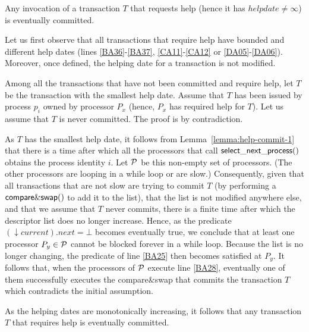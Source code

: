 \begin{lemma}
\label{lemma:helped-transaction}
Any invocation of a transaction $T$ that requests help 
(hence it has $helpdate \neq \infty$) is eventually committed.
\end{lemma}

\begin{proofL}
Let us first observe that all transactions that require help 
have bounded and different help dates  (lines \ref{BA36}-\ref{BA37}, 
 \ref{CA11}-\ref{CA12}  or \ref{DA05}-\ref{DA06}).  
Moreover,  once defined, the helping date for a transaction is not modified. 

Among all the transactions that  have not been committed and require help,
let  $T$  be the transaction with the smallest help date. 
Assume that  $T$ has been issued  by  process  $p_i$ owned  by processor
$P_x$  (hence,  $P_x$ has required  help for  $T$).  
Let us assume that $T$ is never committed. The proof  is by  contradiction. 


As $T$ has the smallest help date, it follows from 
Lemma~\ref{lemma:help-commit-1}  
that there is a time after  which all the processors that call 
${\sf select\_next\_process}()$  obtains the process identity $i$.
Let $\cal P$ be this non-empty set of processors. 
(The other processors are looping  in  a while loop or are slow.) 
Consequently, given that all transactions that are not slow are trying 
to commit  $T$ (by performing  a ${\sf compare\&swap}()$  to add it  to the
list), that the list is not modified anywhere else, and that we assume 
that $T$ never commits, there is a  finite time after which the descriptor 
list does no longer  increase. Hence, as  the  predicate  $(\downarrow
current).next=\bot$ becomes eventually true,  we conclude that at least one  
processor $P_y \in \cal P$ cannot 
be  blocked  forever in a  while  loop. Because the list is no
longer  changing, the predicate of line  \ref{BA25} then becomes 
satisfied at $P_y$.
It follows that,  when  the processors  of  $\cal P$ execute line \ref{BA28}, 
eventually one of them successfully executes the compare\&swap that commits 
the transaction $T$ which contradicts the initial assumption. 

As the helping dates are monotonically increasing, it follows that
any  transaction $T$ that requires help is eventually committed. 
\renewcommand{\toto}{lemma:helped-transaction}
\end{proofL}


